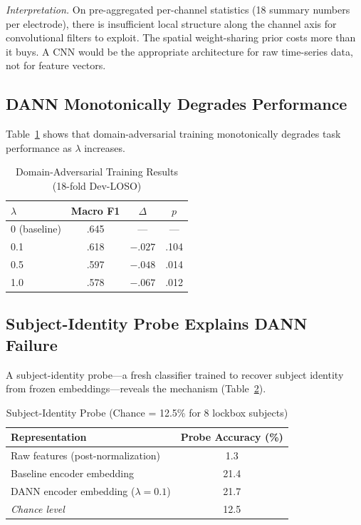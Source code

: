 \documentclass[conference]{IEEEtran}
\begin{document}
\textit{Interpretation.} On pre-aggregated per-channel statistics (18 summary numbers per electrode), there is insufficient local structure along the channel axis for convolutional filters to exploit. The spatial weight-sharing prior costs more than it buys. A CNN would be the appropriate architecture for raw time-series data, not for feature vectors.

\subsection{DANN Monotonically Degrades Performance}
Table~\ref{tab:dann} shows that domain-adversarial training monotonically degrades task performance as $\lambda$ increases.

\begin{table}[t]
\centering
\caption{Domain-Adversarial Training Results (18-fold Dev-LOSO)}
\label{tab:dann}
\begin{tabular}{lccc}
\toprule
$\lambda$ & \textbf{Macro F1} & $\Delta$ & $p$ \\
\midrule
0 (baseline) & .645 & --- & --- \\
0.1 & .618 & $-.027$ & .104 \\
0.5 & .597 & $-.048$ & .014 \\
1.0 & .578 & $-.067$ & .012 \\
\bottomrule
\end{tabular}
\end{table}

\subsection{Subject-Identity Probe Explains DANN Failure}
A subject-identity probe---a fresh classifier trained to recover subject identity from frozen embeddings---reveals the mechanism (Table~\ref{tab:probe}).

\begin{table}[t]
\centering
\caption{Subject-Identity Probe (Chance = 12.5\% for 8 lockbox subjects)}
\label{tab:probe}
\begin{tabular}{lc}
\toprule
\textbf{Representation} & \textbf{Probe Accuracy (\%)} \\
\midrule
Raw features (post-normalization) & 1.3 \\
Baseline encoder embedding & 21.4 \\
DANN encoder embedding ($\lambda\!=\!0.1$) & 21.7 \\
\midrule
\textit{Chance level} & 12.5 \\
\bottomrule
\end{tabular}
\end{table}
\end{document}
